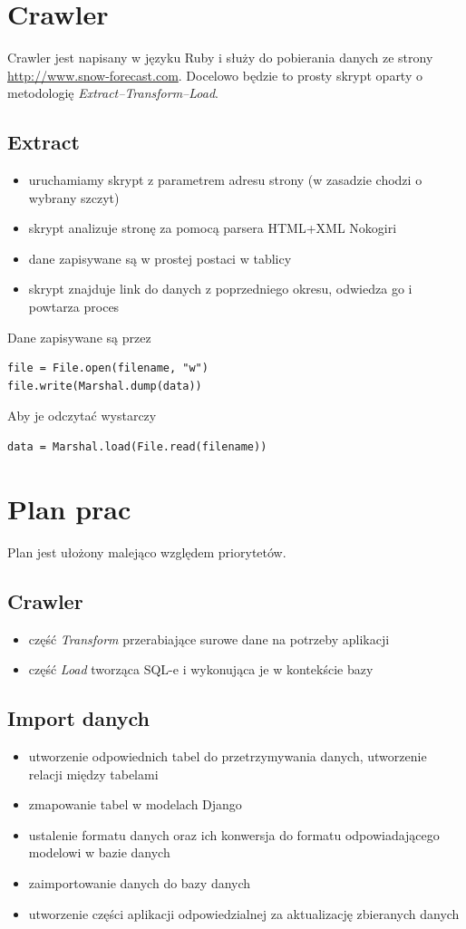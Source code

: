 \documentclass[12pt]{article}
\begin{document}
\section{Crawler}
Crawler jest napisany w języku Ruby i służy do pobierania danych ze strony
\\\url{http://www.snow-forecast.com}.
Docelowo będzie to prosty skrypt oparty o metodologię \emph{Extract--Transform--Load}.
\subsection{Extract}
\begin{itemize}
\item uruchamiamy skrypt z parametrem adresu strony (w zasadzie chodzi o wybrany szczyt)
\item skrypt analizuje stronę za pomocą parsera HTML+XML Nokogiri
\item dane zapisywane są w prostej postaci w tablicy
\item skrypt znajduje link do danych z poprzedniego okresu, odwiedza go i powtarza proces
\end{itemize}
Dane zapisywane są przez
\begin{verbatim}
file = File.open(filename, "w")
file.write(Marshal.dump(data))
\end{verbatim}
Aby je odczytać wystarczy
\begin{verbatim}
data = Marshal.load(File.read(filename))
\end{verbatim}

\section{Plan prac}
Plan jest ułożony malejąco względem priorytetów.
\subsection{Crawler}
\begin{itemize}
  \item część \emph{Transform} przerabiające surowe dane na potrzeby aplikacji
  \item część \emph{Load} tworząca SQL-e i wykonująca je w kontekście bazy
\end{itemize}

\subsection{Import danych}
\begin{itemize}
  \item utworzenie odpowiednich tabel do przetrzymywania danych, utworzenie relacji między tabelami
  \item zmapowanie tabel w modelach Django
  \item ustalenie formatu danych oraz ich konwersja do formatu odpowiadającego modelowi w bazie danych
  \item zaimportowanie danych do bazy danych
  \item utworzenie części aplikacji odpowiedzialnej za aktualizację zbieranych danych
\end{itemize}
\end{document}
